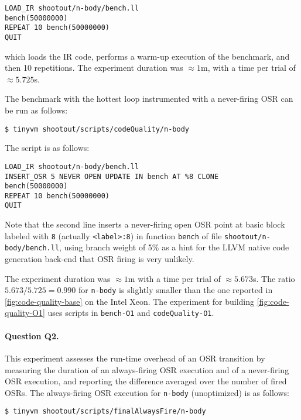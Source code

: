 \begin{small}
\begin{verbatim}
LOAD_IR shootout/n-body/bench.ll
bench(50000000)
REPEAT 10 bench(50000000)
QUIT
\end{verbatim}
\end{small}

\noindent which loads the IR code, performs a warm-up execution of the benchmark, and then 10 repetitions. The experiment duration was $\approx1$m, with a time per trial of $\approx5.725$s. 

The benchmark with the hottest loop instrumented with a never-firing OSR can be run as follows:

\begin{small}
\begin{verbatim}
$ tinyvm shootout/scripts/codeQuality/n-body
\end{verbatim}
\end{small}

\noindent The script is as follows:

\begin{small}
\begin{verbatim}
LOAD_IR shootout/n-body/bench.ll
INSERT_OSR 5 NEVER OPEN UPDATE IN bench AT %8 CLONE
bench(50000000)
REPEAT 10 bench(50000000)
QUIT
\end{verbatim}
\end{small}

\noindent Note that the second line inserts a never-firing open OSR point at basic block labeled with {\tt 8} (actually {\tt <label>:8}) in function {\tt bench} of file {\tt shootout/n-body/bench.ll}, using branch weight of 5\% as a hint for the LLVM native code generation back-end that OSR firing is very unlikely. 

The experiment duration was $\approx1$m with a time per trial of $\approx5.673$s. The ratio $5.673/5.725=0.990$ for {\tt n-body} is slightly smaller than the one reported in \ref{fig:code-quality-base} on the Intel Xeon. The experiment for building \ref{fig:code-quality-O1} uses scripts in {\tt bench-O1} and {\tt codeQuality-O1}.

\paragraph{Question Q2.} This experiment assesses the run-time overhead of an OSR transition by measuring the duration of an always-firing OSR execution and of a never-firing OSR execution, and reporting the difference averaged over the number of fired OSRs. The always-firing OSR execution for {\tt n-body} (unoptimized) is as follows:
\begin{small}
\begin{verbatim}
$ tinyvm shootout/scripts/finalAlwaysFire/n-body
\end{verbatim}
\end{small}

